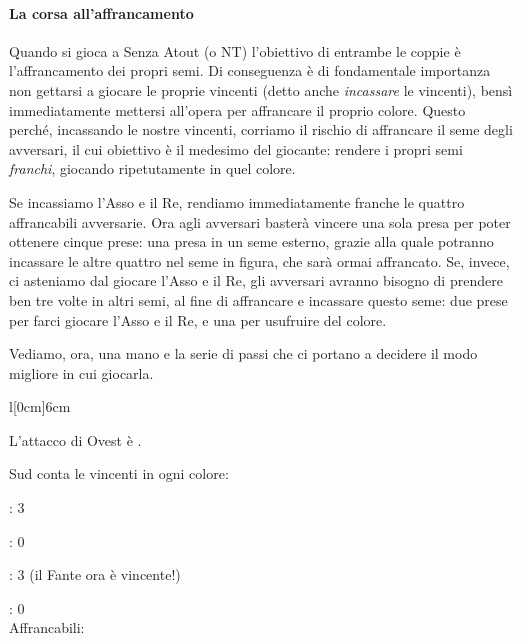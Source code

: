 \documentclass[../corsofiori.tex]{subfiles}
\begin{document}
\paragraph{La corsa all'affrancamento} Quando si gioca a Senza Atout (\SA o \small{NT}\normalsize) l'obiettivo di
entrambe le coppie è l'affrancamento dei propri semi. Di conseguenza è di fondamentale importanza non gettarsi a giocare
le proprie vincenti (detto anche \emph{incassare} le vincenti), bensì immediatamente mettersi all'opera per affrancare
il proprio colore. Questo perché, incassando le nostre vincenti,
corriamo il rischio di affrancare il seme degli avversari, il cui obiettivo è il medesimo del giocante: rendere i propri semi \emph{franchi},
giocando ripetutamente in quel colore.




    Se incassiamo l'Asso e il Re, rendiamo immediatamente franche le quattro affrancabili avversarie. Ora agli avversari
    basterà vincere una sola presa per poter ottenere cinque prese: una presa in un seme esterno, grazie alla quale
    potranno incassare le altre quattro nel seme in figura, che sarà ormai affrancato.
   Se, invece, ci asteniamo dal giocare l'Asso e il Re, gli avversari avranno bisogno di prendere ben tre volte in altri
   semi, al fine di affrancare e incassare questo seme: due prese per farci giocare l'Asso e il Re, e una per usufruire
   del colore.

   Vediamo, ora, una mano e la serie di passi che ci portano a decidere il modo migliore in cui giocarla.

    \newpage




\begin{wraptable}[11]{l}[0cm]{6cm}
    \vspace{-.5cm}
    \showNS*
\end{wraptable}

\noindent L'attacco di Ovest è \Ten\Di.

\noindent Sud conta le vincenti in ogni colore:

\Sp: 3

\He: 0

\Di: 3 (il Fante ora è vincente!)

\Cl: 0\\
\noindent Affrancabili:
\end{document}
